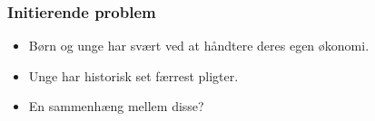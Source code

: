 \begin{frame}
\frametitle{Initierende problem}
    \begin{itemize}
        \item{Børn og unge har svært ved at håndtere deres egen økonomi.}
        \vspace{\baselineskip}
        \item{Unge har historisk set færrest pligter.}
        \vspace{\baselineskip}
        \item{En sammenhæng mellem disse?}
        
    \end{itemize}
\end{frame}

